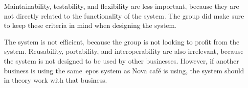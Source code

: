 Maintainability, testability, and flexibility are less important, because they are not directly related to the
functionality of the system.
The group did make sure to keep these criteria in mind when designing the system.

The system is not efficient, because the group is not looking to profit from the system.
Reusability, portability, and interoperability are also irrelevant, because the system is not designed to be used by
other businesses.
However, if another business is using the same~\acrshort{epos} system as Nova café is using, the system should in
theory work with that business.
